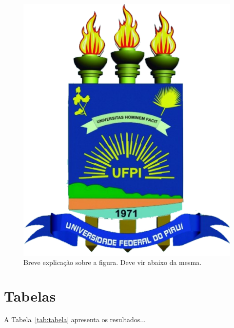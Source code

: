 \begin{figure}[htpb]
   \centering
   \includegraphics[scale=.3]{figs/logo}
   \caption{Breve explicação sobre a figura. Deve vir abaixo da mesma.}
   \label{fig:log}
\end{figure}

\section*{Tabelas}\label{sec:tabelas}

A Tabela~\ref{tab:tabela} apresenta os resultados...

